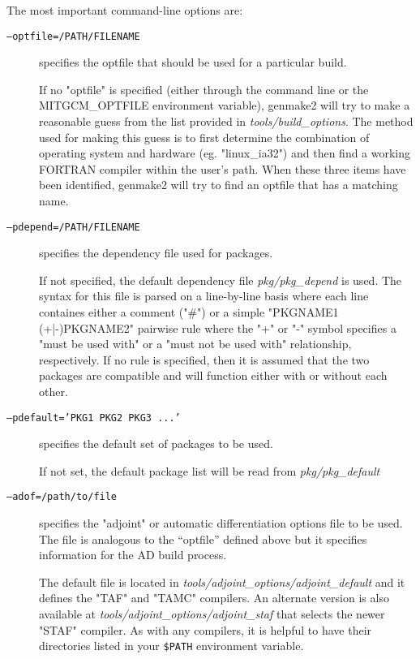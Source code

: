 The most important command-line options are:
\begin{description}
  
\item[\texttt{--optfile=/PATH/FILENAME}] specifies the optfile that
  should be used for a particular build.
  
  If no "optfile" is specified (either through the command line or the
  MITGCM\_OPTFILE environment variable), genmake2 will try to make a
  reasonable guess from the list provided in {\em
    tools/build\_options}.  The method used for making this guess is
  to first determine the combination of operating system and hardware
  (eg. "linux\_ia32") and then find a working FORTRAN compiler within
  the user's path.  When these three items have been identified,
  genmake2 will try to find an optfile that has a matching name.
  
\item[\texttt{--pdepend=/PATH/FILENAME}] specifies the dependency file
  used for packages.
  
  If not specified, the default dependency file {\em pkg/pkg\_depend}
  is used.  The syntax for this file is parsed on a line-by-line basis
  where each line containes either a comment ("\#") or a simple
  "PKGNAME1 (+|-)PKGNAME2" pairwise rule where the "+" or "-" symbol
  specifies a "must be used with" or a "must not be used with"
  relationship, respectively.  If no rule is specified, then it is
  assumed that the two packages are compatible and will function
  either with or without each other.
  
\item[\texttt{--pdefault='PKG1 PKG2 PKG3 ...'}] specifies the default
  set of packages to be used.
  
  If not set, the default package list will be read from {\em
    pkg/pkg\_default}
  
\item[\texttt{--adof=/path/to/file}] specifies the "adjoint" or
  automatic differentiation options file to be used.  The file is
  analogous to the ``optfile'' defined above but it specifies
  information for the AD build process.
  
  The default file is located in {\em
    tools/adjoint\_options/adjoint\_default} and it defines the "TAF"
  and "TAMC" compilers.  An alternate version is also available at
  {\em tools/adjoint\_options/adjoint\_staf} that selects the newer
  "STAF" compiler.  As with any compilers, it is helpful to have their
  directories listed in your {\tt \$PATH} environment variable.
  

\end{description}
